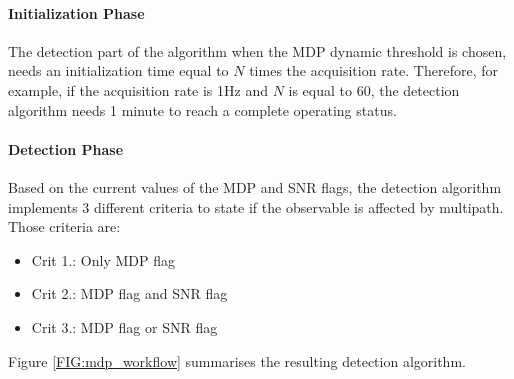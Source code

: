 \paragraph*{Initialization Phase}
The detection part of the algorithm when the MDP dynamic threshold is chosen, needs an initialization time equal to $N$ times the acquisition rate. Therefore, for example, if the acquisition rate is 1Hz and $N$ is equal to 60, the detection algorithm needs 1 minute to reach a complete operating status. 
\paragraph*{Detection Phase}
Based on the current values of the MDP and SNR flags, the detection algorithm implements 3 different criteria to state if the observable is affected by multipath. Those criteria are:
\begin{itemize}
    \item Crit 1.: Only MDP flag
    \item Crit 2.: MDP flag and SNR flag
    \item Crit 3.: MDP flag or SNR flag
\end{itemize}
Figure \ref{FIG:mdp_workflow} summarises the resulting detection algorithm.
